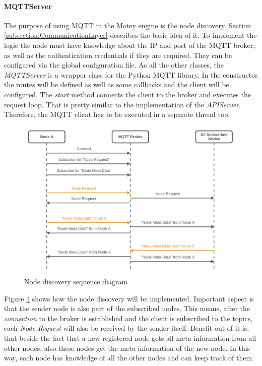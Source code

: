 \paragraph{MQTTServer}
The purpose of using \ac{MQTT} in the Motey engine is the node discovery.
Section \ref{subsection:CommunicationLayer} describes the basic idea of it.
To implement the logic the node must have knowledge about the \ac{IP} and port of the \ac{MQTT} broker, as well as the authentication credentials if they are required.
They can be configured via the global configuration file.
As all the other classes, the \textit{MQTTServer} is a wrapper class for the Python \ac{MQTT} library.
In the constructor the routes will be defined as well as some callbacks and the client will be configured.
The \textit{start} method connects the client to the broker and executes the request loop.
That is pretty similar to the implementation of the \textit{APIServer}.
Therefore, the \ac{MQTT} client has to be executed in a separate thread too.\newline

\begin{figure}[H]
    \centering
    \includegraphics[width=\textwidth]{resources/images/node_discovery.png}
    \caption[Node discovery sequence diagram]{Node discovery sequence diagram}
    \label{fig:node_discovery_squ_dia}
\end{figure}

Figure \ref{fig:node_discovery_squ_dia} shows how the node discovery will be implemented.
Important aspect is that the sender node is also part of the subscribed nodes.
This means, after the \textit{connection} to the broker is established and the client is subscribed to the topics, each \textit{Node Request} will also be received by the sender itself.
Benefit out of it is, that beside the fact that a new registered node gets all meta information from all other nodes, also these nodes get the meta information of the new node.
In this way, each node has knowledge of all the other nodes and can keep track of them.\newline

